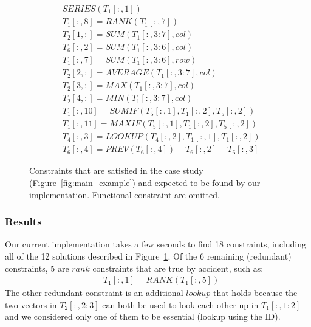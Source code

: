 \documentclass{sig-alternate-05-2015}
\newcommand{\range}[3]{\ensuremath{#1[#2,#3]}}
\newcommand{\rangeto}[2]{#1{:}#2}
\newcommand{\rangeall}{:}
\newcommand{\eccalc}[2]{\ensuremath{#1 = #2}}
\newcommand{\ecrank}[2]{\eccalc{#1}{\mathit{RANK}(#2)}}
\newcommand{\eclookupf}[4]{\ensuremath{\mathit{LOOKUP}_{\mathit{#4}}(#1, #2, #3)}}
\newcommand{\eclookup}[4]{\eccalc{#1}{\eclookupf{#2}{#3}{#4}{}}}
\newcommand{\ecaggc}[3]{\eccalc{#2}{\mathit{#1}(#3, col)}}
\newcommand{\ecsumc}[2]{\eccalc{#1}{\mathit{SUM}(#2, col)}}
\newcommand{\ecsumr}[2]{\eccalc{#1}{\mathit{SUM}(#2, row)}}
\newcommand{\ecaggif}[5]{\eccalc{#2}{\mathit{#1IF}(#3, #4, #5)}}
\begin{document}
\begin{figure}
  {\small
    \begin{align*}
      & SERIES(\range{T_{1}}{\rangeall}{1}) \\
%
      & \ecrank{\range{T_{1}}{\rangeall}{8}}{\range{T_{1}}{\rangeall}{7}} \\
%
      & \ecsumc{\range{T_{2}}{1}{\rangeall}}{\range{T_{1}}{\rangeall}{\rangeto{3}{7}}} \\
%
      & \ecsumc{\range{T_{6}}{\rangeall}{2}}{\range{T_{1}}{\rangeall}{\rangeto{3}{6}}} \\
%
      & \ecsumr{\range{T_{1}}{\rangeall}{7}}{\range{T_{1}}{\rangeall}{\rangeto{3}{6}}} \\
%
      & \ecaggc{AVERAGE}{\range{T_{2}}{2}{\rangeall}}{\range{T_{1}}{\rangeall}{\rangeto{3}{7}}} \\
%
      & \ecaggc{MAX}{\range{T_{2}}{3}{\rangeall}}{\range{T_{1}}{\rangeall}{\rangeto{3}{7}}} \\
%
      & \ecaggc{MIN}{\range{T_{2}}{4}{\rangeall}}{\range{T_{1}}{\rangeall}{\rangeto{3}{7}}} \\
%
      & \ecaggif{SUM}{\range{T_{1}}{\rangeall}{10}}{\range{T_{5}}{\rangeall}{1}}{\range{T_{1}}{\rangeall}{2}}{\range{T_{5}}{\rangeall}{2}} \\
%
      & \ecaggif{MAX}{\range{T_{1}}{\rangeall}{11}}{\range{T_{5}}{\rangeall}{1}}{\range{T_{1}}{\rangeall}{2}}{\range{T_{5}}{\rangeall}{2}} \\
%
      & \eclookup{\range{T_{4}}{\rangeall}{3}}{\range{T_{4}}{\rangeall}{2}}{\range{T_{1}}{\rangeall}{1}}{\range{T_{1}}{\rangeall}{2}} \\
%
      & \range{T_{6}}{\rangeall}{4} = PREV(\range{T_{6}}{\rangeall}{4}) + \range{T_{6}}{\rangeall}{2} - \range{T_{6}}{\rangeall}{3}
    \end{align*}
  }
  \caption{Constraints that are satisfied in the case study (Figure~\ref{fig:main_example}) and expected to be found by our implementation. Functional constraint are omitted.}
  \label{fig:sol_example}
\end{figure}

\subsubsection{Results}
Our current implementation takes a few seconds to find 18 constraints, including all of the 12 solutions described in Figure~\ref{fig:sol_example}.
Of the 6 remaining (redundant) constraints, 5 are $\mathit{rank}$ constraints that are true by accident, such as: \begin{align*}
  & \ecrank{\range{T_1}{\rangeall}{1}}{\range{T_1}{\rangeall}{5}}
\end{align*}
The other redundant constraint is an additional $\mathit{lookup}$ that holds because the two vectors in \range{T_2}{\rangeall}{\rangeto{2}{3}} can both be used to look each other up in \range{T_1}{\rangeall}{\rangeto{1}{2}} and we considered only one of them to be essential (lookup using the ID).
\end{document}
